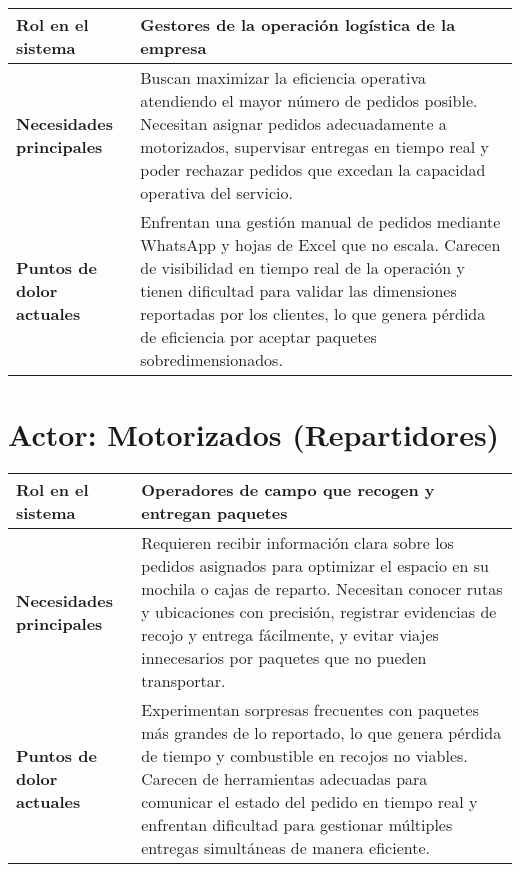 \begin{table}[H]
\centering
\begin{tabular}{|p{4cm}|p{10cm}|}
\hline
\textbf{Rol en el sistema} & Gestores de la operación logística de la empresa \\
\hline
\textbf{Necesidades principales} & Buscan maximizar la eficiencia operativa atendiendo el mayor número de pedidos posible. Necesitan asignar pedidos adecuadamente a motorizados, supervisar entregas en tiempo real y poder rechazar pedidos que excedan la capacidad operativa del servicio. \\
\hline
\textbf{Puntos de dolor actuales} & Enfrentan una gestión manual de pedidos mediante WhatsApp y hojas de Excel que no escala. Carecen de visibilidad en tiempo real de la operación y tienen dificultad para validar las dimensiones reportadas por los clientes, lo que genera pérdida de eficiencia por aceptar paquetes sobredimensionados. \\
\hline
\end{tabular}
\end{table}

\section*{Actor: Motorizados (Repartidores)}

\begin{table}[H]
\centering
\begin{tabular}{|p{4cm}|p{10cm}|}
\hline
\textbf{Rol en el sistema} & Operadores de campo que recogen y entregan paquetes \\
\hline
\textbf{Necesidades principales} & Requieren recibir información clara sobre los pedidos asignados para optimizar el espacio en su mochila o cajas de reparto. Necesitan conocer rutas y ubicaciones con precisión, registrar evidencias de recojo y entrega fácilmente, y evitar viajes innecesarios por paquetes que no pueden transportar. \\
\hline
\textbf{Puntos de dolor actuales} & Experimentan sorpresas frecuentes con paquetes más grandes de lo reportado, lo que genera pérdida de tiempo y combustible en recojos no viables. Carecen de herramientas adecuadas para comunicar el estado del pedido en tiempo real y enfrentan dificultad para gestionar múltiples entregas simultáneas de manera eficiente. \\
\hline
\end{tabular}
\end{table}

